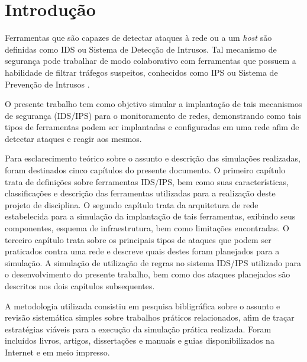 \chapter[Introdução]{Introdução}
\label{chap:introducao}
	
		Ferramentas que são capazes de detectar ataques à rede ou a um \textit{host} são definidas como IDS ou Sistema de Detecção de Intrusos. Tal mecanismo de segurança pode trabalhar de modo colaborativo com ferramentas que possuem a habilidade de filtrar tráfegos suspeitos, conhecidos como IPS  ou Sistema de Prevenção de Intrusos \cite{Kurose}.
		
		O presente trabalho tem como objetivo simular a implantação de tais mecanismos de segurança (IDS/IPS) para o monitoramento de redes, demonstrando como tais tipos de ferramentas podem ser implantadas  e configuradas em uma rede afim de detectar ataques e reagir aos mesmos.
		
		Para esclarecimento teórico sobre o assunto e descrição das simulações realizadas, foram destinados cinco capítulos do presente documento. O primeiro capítulo trata de definições sobre ferramentas IDS/IPS, bem como suas características, classificações e descrição das ferramentas utilizadas para a realização deste projeto de disciplina. O segundo capítulo trata da arquitetura de rede estabelecida para a simulação da implantação de tais ferramentas, exibindo seus componentes, esquema de infraestrutura, bem como limitações encontradas. O terceiro capítulo trata sobre os principais tipos de ataques que podem ser praticados contra uma rede e descreve quais destes foram planejados para a simulação. A simulação de utilização de regras no sistema IDS/IPS utilizado para o desenvolvimento do presente trabalho, bem como dos ataques planejados são descritos nos dois capítulos subsequentes.
		
		A metodologia utilizada consistiu em pesquisa bibligráfica sobre o assunto e revisão sistemática simples sobre trabalhos práticos relacionados, afim de traçar estratégias viáveis para a execução da simulação prática realizada. Foram incluídos livros, artigos, dissertações e manuais e guias disponibilizados na Internet e em meio impresso.